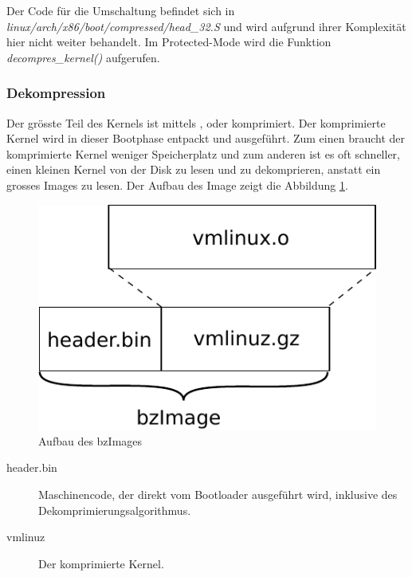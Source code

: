 Der Code für die Umschaltung befindet sich in \emph{linux/arch/x86/boot/compressed/head\_32.S} und wird aufgrund ihrer Komplexität hier
nicht weiter behandelt. Im Protected-Mode wird die Funktion \emph{decompres\_kernel()} aufgerufen.

\subsubsection{Dekompression}

Der grösste Teil des Kernels ist mittels ,  oder  komprimiert. Der komprimierte Kernel wird in dieser
Bootphase entpackt und ausgeführt. Zum einen braucht der komprimierte Kernel weniger Speicherplatz und zum anderen ist es oft schneller,
einen kleinen Kernel von der Disk zu lesen und zu dekomprieren, anstatt ein grosses Images zu lesen. Der Aufbau des Image zeigt die Abbildung \ref{vmlinuz}.

\begin{figure}[h!]
   \begin{center}
      \includegraphics{images/bzimage}
   \end{center}
   \caption{Aufbau des bzImages}
   \label{vmlinuz}
\end{figure}

\begin{description}
   \item[header.bin] 
      Maschinencode, der direkt vom Bootloader ausgeführt wird, inklusive des Dekomprimierungsalgorithmus.

   \item[vmlinuz]
      Der komprimierte Kernel.

\end{description} 

